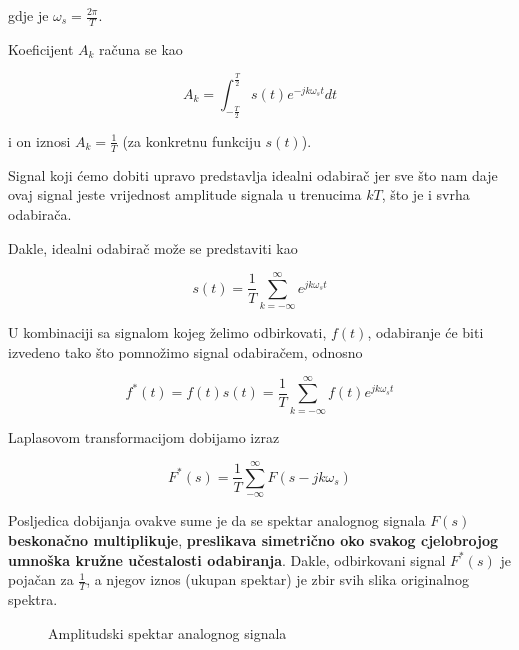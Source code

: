 \documentclass[12pt]{IEEEtran}
\numberwithin{equation}{subsection}
\numberwithin{figure}{section}
\begin{document}
gdje je $\omega_{s} = \frac{2\pi}{T}$.

Koeficijent $A_k$ ra\v{c}una se kao 

\begin{equation}
    A_{k} = \int_{-\frac{T}{2}}^{\frac{T}{2}}{s(t)e^{-jk\omega_{s}t}}dt
\end{equation}

i on iznosi $A_{k} = \frac{1}{T}$ (za konkretnu funkciju $s(t)$).

Signal koji \'{c}emo dobiti upravo predstavlja idealni odabira\v{c} 
jer sve \v{s}to nam daje ovaj signal jeste vrijednost amplitude signala 
u trenucima $kT$, \v{s}to je i svrha odabira\v{c}a.

Dakle, idealni odabira\v{c} mo\v{z}e se predstaviti kao 

\begin{equation}
    s(t) = \frac{1}{T}\sum_{k = -\infty}^{\infty}{e^{jk\omega_{s}t}}
\end{equation}

U kombinaciji sa signalom kojeg \v{z}elimo odbirkovati, $f(t)$, odabiranje 
\'{c}e biti izvedeno tako \v{s}to pomno\v{z}imo signal odabira\v{c}em, 
odnosno 

\begin{equation}
    f^{*}(t) = f(t)s(t) = \frac{1}{T}\sum_{k = -\infty}^{\infty}{f(t)e^{jk\omega_{s}t}}
\end{equation}

Laplasovom transformacijom dobijamo izraz

\begin{equation}
    F^{*}(s) = \frac{1}{T}\sum_{-\infty}^{\infty}{F(s - jk\omega_{s})}
\end{equation}

Posljedica dobijanja ovakve sume je da se spektar analognog signala $F(s)$
\textbf{beskona\v{c}no multiplikuje}, \textbf{preslikava simetri\v{c}no oko svakog cjelobrojog
umno\v{s}ka kru\v{z}ne u\v{c}estalosti odabiranja}. Dakle, odbirkovani signal $F^{*}(s)$
je poja\v{c}an za $\frac{1}{T}$, a njegov iznos (ukupan spektar) je zbir svih slika
originalnog spektra. 

\newpage

\begin{figure}
    \centering
    \caption{Amplitudski spektar analognog signala}
\end{figure}
\end{document}
